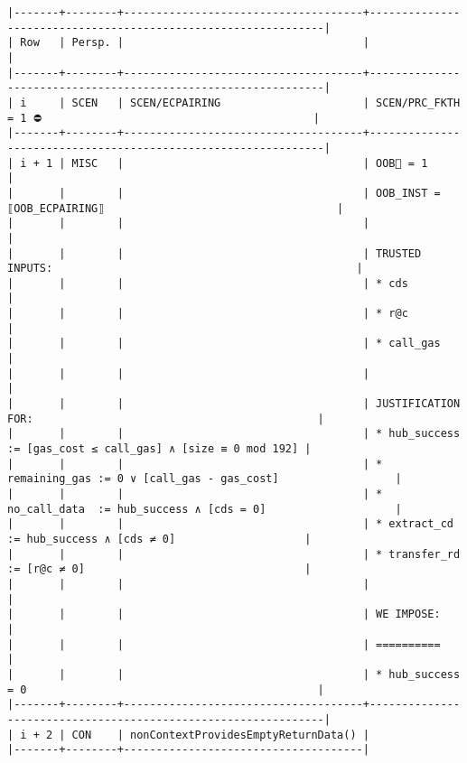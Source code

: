 \documentclass[varwidth=\maxdimen,margin=0.5cm,multi={verbatim}]{standalone}
\begin{document}
\begin{verbatim}
|-------+--------+-------------------------------------+---------------------------------------------------------------|
| Row   | Persp. |                                     |                                                               |
|-------+--------+-------------------------------------+---------------------------------------------------------------|
| i     | SCEN   | SCEN/ECPAIRING                      | SCEN/PRC_FKTH = 1 ⛔                                          |
|-------+--------+-------------------------------------+---------------------------------------------------------------|
| i + 1 | MISC   |                                     | OOB🏴 = 1                                                     |
|       |        |                                     | OOB_INST = ⟦OOB_ECPAIRING⟧                                    |
|       |        |                                     |                                                               |
|       |        |                                     | TRUSTED INPUTS:                                               |
|       |        |                                     | * cds                                                         |
|       |        |                                     | * r@c                                                         |
|       |        |                                     | * call_gas                                                    |
|       |        |                                     |                                                               |
|       |        |                                     | JUSTIFICATION FOR:                                            |
|       |        |                                     | * hub_success   := [gas_cost ≤ call_gas] ∧ [size ≡ 0 mod 192] |
|       |        |                                     | * remaining_gas := 0 ∨ [call_gas - gas_cost]                  |
|       |        |                                     | * no_call_data  := hub_success ∧ [cds = 0]                    |
|       |        |                                     | * extract_cd    := hub_success ∧ [cds ≠ 0]                    |
|       |        |                                     | * transfer_rd   := [r@c ≠ 0]                                  |
|       |        |                                     |                                                               |
|       |        |                                     | WE IMPOSE:                                                    |
|       |        |                                     | ==========                                                    |
|       |        |                                     | * hub_success = 0                                             |
|-------+--------+-------------------------------------+---------------------------------------------------------------|
| i + 2 | CON    | nonContextProvidesEmptyReturnData() |
|-------+--------+-------------------------------------|
\end{verbatim}
\end{document}
